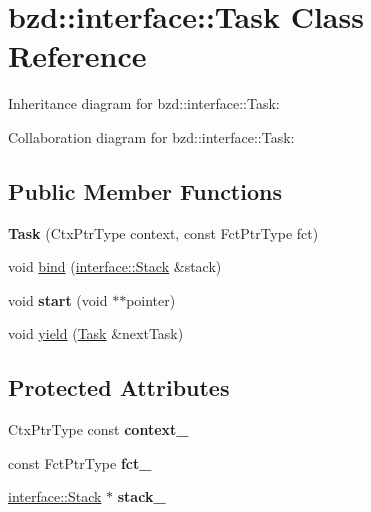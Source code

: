 \hypertarget{classbzd_1_1interface_1_1Task}{}\section{bzd\+:\+:interface\+:\+:Task Class Reference}
\label{classbzd_1_1interface_1_1Task}


Inheritance diagram for bzd\+:\+:interface\+:\+:Task\+:


Collaboration diagram for bzd\+:\+:interface\+:\+:Task\+:
\subsection*{Public Member Functions}
\begin{DoxyCompactItemize}
\item 
\mbox{\label{classbzd_1_1interface_1_1Task_af888e2ae31e5a625b9b63d98be1638a0}} 
{\bfseries Task} (Ctx\+Ptr\+Type context, const Fct\+Ptr\+Type fct)
\item 
void \hyperlink{classbzd_1_1interface_1_1Task_a8a1ac60ed1c1a1c2db3e4e11035b5488}{bind} (\hyperlink{classbzd_1_1interface_1_1Stack}{interface\+::\+Stack} \&stack)
\item 
\mbox{\label{classbzd_1_1interface_1_1Task_a159eb6308c5e6ac3b890b386517c565d}} 
void {\bfseries start} (void $\ast$$\ast$pointer)
\item 
void \hyperlink{classbzd_1_1interface_1_1Task_a262c01237a7cb301d6c3b493474c44ea}{yield} (\hyperlink{classbzd_1_1interface_1_1Task}{Task} \&next\+Task)
\end{DoxyCompactItemize}
\subsection*{Protected Attributes}
\begin{DoxyCompactItemize}
\item 
\mbox{\label{classbzd_1_1interface_1_1Task_a66f8e668724d55ce7a9a2f767af86cde}} 
Ctx\+Ptr\+Type const {\bfseries context\+\_\+}
\item 
\mbox{\label{classbzd_1_1interface_1_1Task_aff1cdc3d37e73a2086cba1b346e13949}} 
const Fct\+Ptr\+Type {\bfseries fct\+\_\+}
\item 
\mbox{\label{classbzd_1_1interface_1_1Task_a3ad53a1a67d87815808dc2e535d44be3}} 
\hyperlink{classbzd_1_1interface_1_1Stack}{interface\+::\+Stack} $\ast$ {\bfseries stack\+\_\+}
\end{DoxyCompactItemize}


